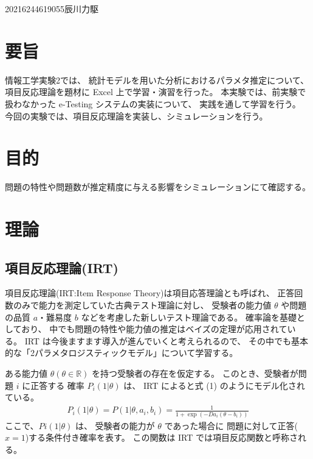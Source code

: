 \documentclass[12pt]{jarticle}
\begin{document}
{2021}{6}{24}{4619055}{辰川力駆}
\section{要旨}

情報工学実験2では、
統計モデルを用いた分析におけるパラメタ推定について、
項目反応理論を題材に Excel 上で学習・演習を行った。
本実験では、前実験で扱わなかった e-Testing システムの実装について、
実践を通して学習を行う。
今回の実験では、項目反応理論を実装し、シミュレーションを行う。

\section{目的}
問題の特性や問題数が推定精度に与える影響をシミュレーションにて確認する。

\section{理論}
\subsection{項目反応理論(IRT)}
項目反応理論(IRT:Item Response Theory)は項目応答理論とも呼ばれ、
正答回数のみで能力を測定していた古典テスト理論に対し、
受験者の能力値 $\theta$ や問題の品質 $a$・難易度 $b$ などを考慮した新しいテスト理論である。
確率論を基礎としており、
中でも問題の特性や能力値の推定はベイズの定理が応用されている。
IRT は今後ますます導入が進んでいくと考えられるので、
その中でも基本的な「2パラメタロジスティックモデル」について学習する。

ある能力値 $\theta(\theta \in \mathbb{R})$ を持つ受験者の存在を仮定する。
このとき、受験者が問題 $i$ に正答する
確率 $P_i(1|\theta)$ は、
IRT によると式 (1) のようにモデル化されている。
\begin{eqnarray}
    P_i(1|\theta) = P(1|\theta, a_i, b_i) = \frac{1}{1+\exp(-Da_i(\theta-b_i))}
\end{eqnarray}
ここで、$Pi(1|\theta)$ は、
受験者の能力が $\theta$ であった場合に
問題に対して正答($x = 1$)する条件付き確率を表す。
この関数は IRT では項目反応関数と呼称される。
\end{document}
